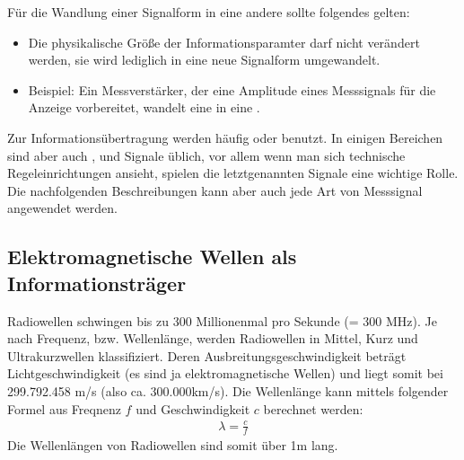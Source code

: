 \documentclass[letterpaper,10pt,english]{jupyterBook}
\begin{document}
\sphinxAtStartPar
Für die Wandlung einer Signalform in eine andere sollte folgendes gelten:
\begin{itemize}
\item {} 
\sphinxAtStartPar
Die physikalische Größe der Informationsparamter darf nicht verändert werden, sie wird lediglich in eine neue Signalform umgewandelt.

\item {} 
\sphinxAtStartPar
Beispiel: Ein Messverstärker, der eine Amplitude eines Messsignals für die Anzeige vorbereitet, wandelt eine  in eine .

\end{itemize}

\sphinxAtStartPar
Zur Informationsübertragung werden häufig  oder  benutzt. In einigen Bereichen sind aber auch ,  und  Signale üblich, vor allem wenn man sich technische Regeleinrichtungen ansieht, spielen die letztgenannten Signale eine wichtige Rolle. Die nachfolgenden Beschreibungen kann aber auch jede Art von Messsignal angewendet werden.

\sphinxAtStartPar
{}


\subsection{Elektromagnetische Wellen als Informationsträger}
\label{\detokenize{content/3_basics:elektromagnetische-wellen-als-informationstrager}}
\sphinxAtStartPar
{} Radiowellen schwingen bis zu 300 Millionen\sphinxhyphen{}mal pro Sekunde (= 300 MHz). Je nach Frequenz, bzw. Wellenlänge, werden Radiowellen in Mittel\sphinxhyphen{}, Kurz\sphinxhyphen{} und Ultrakurzwellen klassifiziert. Deren Ausbreitungsgeschwindigkeit beträgt Lichtgeschwindigkeit (es sind ja elektromagnetische Wellen) und liegt somit bei 299.792.458 m/s (also ca. 300.000km/s). Die Wellenlänge kann mittels folgender Formel aus Freqnenz \(f\) und Geschwindigkeit \(c\) berechnet werden:
\begin{equation*}
\begin{split} \lambda = \frac{c}{f}\end{split}
\end{equation*}
\sphinxAtStartPar
Die Wellenlängen von Radiowellen sind somit über 1m lang.
\end{document}
